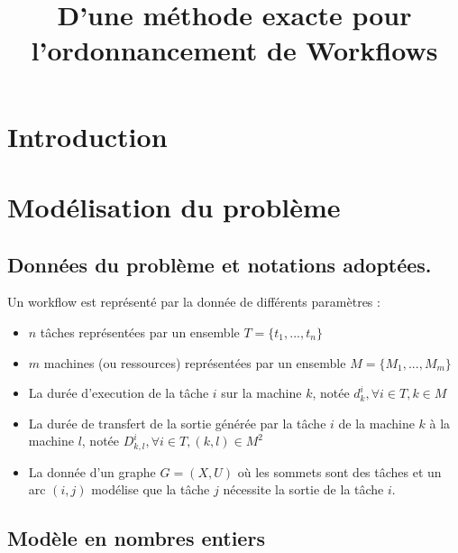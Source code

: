 \documentclass{report}
\title{D'une méthode exacte pour l'ordonnancement de Workflows}
\begin{document}
\maketitle
\chapter*{Introduction}
\tableofcontents

\chapter{Modélisation du problème}
\section{Données du problème et notations adoptées.}
Un workflow est représenté par la donnée de différents paramètres :
\begin{itemize}
  \item $n$ tâches représentées par un ensemble $T=\{t_1,...,t_n\}$
  \item $m$ machines (ou ressources) représentées par un ensemble $M=\{M_1,...,M_m\}$
  \item La durée d'execution de la tâche $i$ sur la machine $k$, notée $d^i_k, \forall i \in T, k \in M$
  \item La durée de transfert de la sortie générée par la tâche $i$ de la machine $k$ à la machine $l$, notée $D^i_{k,l}, \forall i \in T, (k,l) \in M^2$
  \item La donnée d'un graphe $G=(X,U)$ où les sommets sont des tâches et un arc $(i,j)$ modélise que la tâche $j$ nécessite la sortie de la tâche $i$.
\end{itemize}
\section{Modèle en nombres entiers}
\end{document}
